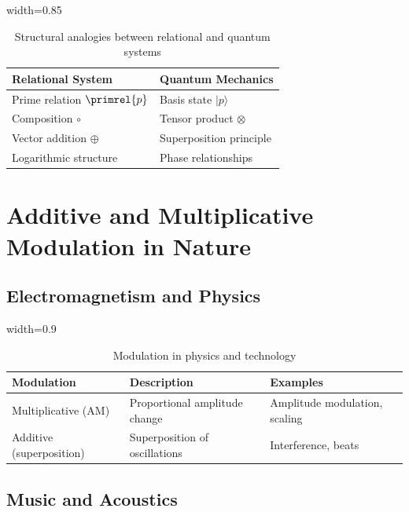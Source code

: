	\begin{table}[htbp]
		\centering
		\begin{adjustbox}{width=0.85\textwidth}
			\begin{tabular}{ll}
				\toprule
				\textbf{Relational System} & \textbf{Quantum Mechanics} \\
				\midrule
				Prime relation $\primrel{p}$ & Basis state $|p\rangle$ \\
				Composition $\circ$ & Tensor product $\otimes$ \\
				Vector addition $\oplus$ & Superposition principle \\
				Logarithmic structure & Phase relationships \\
				\bottomrule
			\end{tabular}
		\end{adjustbox}
		\caption{Structural analogies between relational and quantum systems}
		\label{tab:quantenanalogien}
	\end{table}
	
	\section{Additive and Multiplicative Modulation in Nature}
	
	\subsection{Electromagnetism and Physics}
	
	\begin{table}[htbp]
		\centering
		\begin{adjustbox}{width=0.9\textwidth}
			\begin{tabular}{lll}
				\toprule
				\textbf{Modulation} & \textbf{Description} & \textbf{Examples} \\
				\midrule
				Multiplicative (AM) & Proportional amplitude change & Amplitude modulation, scaling \\
				Additive (superposition) & Superposition of oscillations & Interference, beats \\
				\bottomrule
			\end{tabular}
		\end{adjustbox}
		\caption{Modulation in physics and technology}
		\label{tab:modulation}
	\end{table}
	
	\subsection{Music and Acoustics}
	
